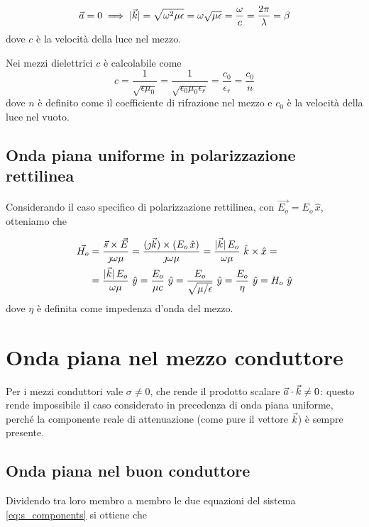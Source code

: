 		\begin{equation*}
				\vec{a} = 0 \implies |\vec{k}| = \sqrt{\omega^2 \mu \epsilon} = \omega \sqrt{\mu \epsilon} = \frac{\omega}{c} = \frac{2 \pi}{\lambda} = \beta
		\end{equation*}
		dove $c$ è la velocità della luce nel mezzo.

		Nei mezzi dielettrici $c$ è calcolabile come
		\begin{equation*}
				c = \frac{1}{\sqrt{\epsilon \mu_0}} = \frac{1}{\sqrt{\epsilon_0 \mu_0 \epsilon_r}} = \frac{c_0}{\epsilon_r} = \frac{c_0}{n}
		\end{equation*}
		dove $n$ è definito come il coefficiente di rifrazione nel mezzo e $c_0$ è la velocità della luce nel vuoto.

	\subsection{Onda piana uniforme in polarizzazione rettilinea}
		Considerando il caso specifico di polarizzazione rettilinea, con $\vec{E_o} = E_o \, \hat{x}$, otteniamo che

		\begin{equation*} \begin{split}
			\vec{H_o} &= \frac{\vec{s} \times \vec{E}} {\jmath \omega \mu}
				= \frac{(\jmath \vec{k}) \times (E_o \, \hat{x})}{\jmath \omega \mu}
				= \frac{|\vec{k}| \, E_o}{\omega \mu} ~ \hat{k} \times \hat{x} = \\
			& = \frac{|\vec{k}| \, E_o}{\omega \mu} ~ \hat{y}
				= \frac{E_o}{\mu c} ~ \hat{y}
				= \frac{E_o}{\sqrt{\mu / \epsilon}} ~ \hat{y}
				= \frac{E_o}{\eta} ~ \hat{y}
				= H_o ~ \hat{y}
		\end{split} \end{equation*}
		dove $\eta$ è definita come impedenza d'onda del mezzo.

\section{Onda piana nel mezzo conduttore}
	Per i mezzi conduttori vale $\sigma \neq 0$, che rende il prodotto scalare $\vec{a} \cdot \vec{k} \neq 0$: questo rende impossibile il caso considerato in precedenza di onda piana uniforme, perché la componente reale di attenuazione (come pure il vettore $\vec{k}$) è sempre presente.

	\subsection{Onda piana nel buon conduttore} \label{sec:onda_piana_conduttore}
		Dividendo tra loro membro a membro le due equazioni del sistema \ref{eq:s_components} si ottiene che

